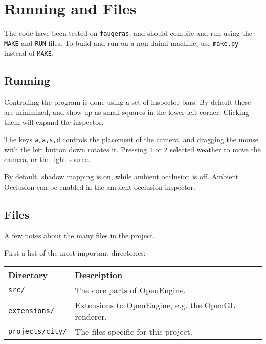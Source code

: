 
\section{Running and Files}

The code have been tested on \texttt{faugeras}, and should compile and
run using the \texttt{MAKE} and \texttt{RUN} files. To build and run
on a non-daimi machine, use \texttt{make.py} instead of \texttt{MAKE}.



\subsection{Running}

Controlling the program is done using a set of inspector bars. By
default these are minimized, and show up as small squares in the lower
left corner. Clicking them will expand the inspector.

The keys \texttt{w,a,s,d} controls the placement of the camera, and
dragging the mouse with the left button down rotates it. Pressing
\texttt{1} or \texttt{2} selected weather to move the camera, or the
light source.

By default, shadow mapping is on, while ambient occlusion is
off. Ambient Occlusion can be enabled in the ambient occlusion
inspector.

\subsection{Files}

A few notes about the many files in the project.

First a list of the most important directories:

\begin{center} 
  \begin{tabular}{|l|l|}
    \hline 
    \textbf{Directory} & \textbf{Description} \\ \hline 
    \texttt{src/} & The core parts of OpenEngine. \\ \hline
    \texttt{extensions/} & Extensions to OpenEngine, e.g. the OpenGL renderer. \\ \hline
    \texttt{projects/city/} & The files specific for this project. \\ \hline
  \end{tabular}
\end{center}

